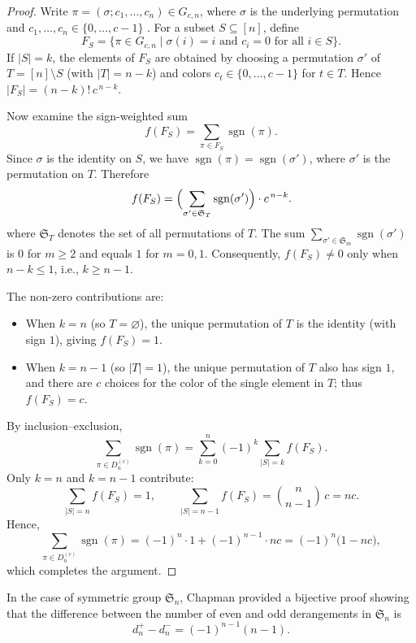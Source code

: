 \documentclass[a4paper,12pt]{article}
\begin{document}
\begin{proof}
Write $\pi = (\sigma; c_1,\dots,c_n) \in G_{c,n}$, where $\sigma$ is the underlying permutation and $c_1,\ldots,c_n \in \{0,\ldots,c-1\}$ . For a subset $S \subseteq [n]$, define  
\[
F_S = \{\pi \in G_{c,n} \mid \sigma(i) = i \text{ and } c_i = 0 \text{ for all } i \in S \}.
\]  
If $|S| = k$, the elements of $F_S$ are obtained by choosing a permutation $\sigma'$ of $T = [n] \setminus S$ (with $|T| = n-k$) and colors $c_t \in \{0, \dots, c-1\}$ for $t \in T$. Hence $|F_S| = (n-k)! \, c^{\,n-k}$.

Now examine the sign-weighted sum  
\[
f(F_S) = \sum_{\pi \in F_S} \operatorname{sgn}(\pi).
\]  
Since $\sigma$ is the identity on $S$, we have $\operatorname{sgn}(\pi) = \operatorname{sgn}(\sigma')$, where $\sigma'$ is the permutation on $T$. Therefore  
\[
f(F_S) = \Bigl( \sum_{\sigma' \in \mathfrak{S}_T} \operatorname{sgn}(\sigma') \Bigr) \cdot c^{\,n-k}.
\]  
where $\mathfrak{S}_T$ denotes the set of all permutations of $T$.
The sum $\sum_{\sigma' \in \mathfrak{S}_m} \operatorname{sgn}(\sigma')$ is $0$ for $m \ge 2$ and equals $1$ for $m = 0, 1$. Consequently, $f(F_S) \neq 0$ only when $n - k \le 1$, i.e., $k \ge n-1$.

The non-zero contributions are:  

\begin{itemize}
    \item When $k = n$ (so $T = \varnothing$), the unique permutation of $T$ is the identity (with sign $1$), giving $f(F_S) = 1$.
    \item When $k = n-1$ (so $|T| = 1$), the unique permutation of $T$ also has sign $1$, and there are $c$ choices for the color of the single element in $T$; thus $f(F_S) = c$.
\end{itemize}

By inclusion--exclusion,  
\[
\sum_{\pi \in D_n^{(c)}} \operatorname{sgn}(\pi)
= \sum_{k=0}^n (-1)^k \sum_{|S| = k} f(F_S).
\]  
Only $k = n$ and $k = n-1$ contribute:  
\[
\sum_{|S| = n} f(F_S) = 1, \qquad 
\sum_{|S| = n-1} f(F_S) = \binom{n}{n-1} \, c = n c.
\]  
Hence,  
\[
\sum_{\pi \in D_n^{(c)}} \operatorname{sgn}(\pi)= (-1)^n \cdot 1 + (-1)^{n-1} \cdot n c
= (-1)^n \bigl( 1 - n c \bigr),
\]  
which completes the argument.
\end{proof}

In the case of symmetric group $\mathfrak{S}_n$, Chapman \cite{chapman2001} provided a bijective proof showing that the difference between the number of even and odd derangements in $\mathfrak{S}_n$ is 
\begin{equation}\label{chapman}
  d_n^{+}-d_n^{-}=(-1)^{n-1}(n-1).  
\end{equation}
\end{document}
